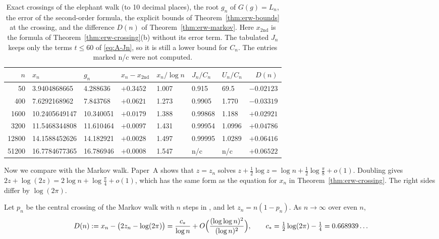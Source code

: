 \begin{table}[t]
\centering\small
\begin{tabular}{@{}rllllllr@{}}
\toprule
$n$ & $x_n$ & $g_n$ & $x_n-x_{\mathrm{2nd}}$ & $x_n/\log n$ & $J_n/C_n$ & $U_n/C_n$ & $D(n)$\\
\midrule
50 & 3.9404868665 & 4.288636 & $+0.3452$ & 1.007 & 0.915 & 69.5 & $-0.02123$\\
400 & 7.6292168962 & 7.843768 & $+0.0621$ & 1.273 & 0.9905 & 1.770 & $-0.03319$\\
1600 & 10.2405649147 & 10.340051 & $+0.0179$ & 1.388 & 0.99868 & 1.188 & $+0.02921$\\
3200 & 11.5468344808 & 11.610464 & $+0.0097$ & 1.431 & 0.99954 & 1.0996 & $+0.04786$\\
12800 & 14.1588452626 & 14.182921 & $+0.0028$ & 1.497 & 0.99995 & 1.0289 & $+0.06416$\\
51200 & 16.7784677365 & 16.786946 & $+0.0008$ & 1.547 & n/c & n/c & $+0.06522$\\
\bottomrule
\end{tabular}
\caption{Exact crossings of the elephant walk (to 10 decimal places), the
root $g_n$ of $G(g)=L_n$, the error of the second-order formula, the
explicit bounds of Theorem~\ref{thm:erw-bounds} at the crossing, and the
difference $D(n)$ of Theorem~\ref{thm:erw-markov}. Here $x_{\mathrm{2nd}}$
is the formula of Theorem~\ref{thm:erw-crossing}(b) without its error term.
The tabulated $J_n$ keeps only the terms $t\le60$ of \eqref{eq:A-Jn}, so it
is still a lower bound for $C_n$. The entries marked n/c were not
computed.}
\label{tab:erw-crossing}
\end{table}

Now we compare with the Markov walk. Paper~A \cite{paperA} shows that
$z=z_n$ solves $z+\frac12\log z=\log n+\frac12\log\frac\pi8+o(1)$. Doubling
gives $2z+\log(2z)=2\log n+\log\frac\pi4+o(1)$, which has the same form as
the equation for $x_n$ in Theorem~\ref{thm:erw-crossing}. The right sides
differ by $\log(2\pi)$.

\begin{theorem}\label{thm:erw-markov}
Let $p_n$ be the central crossing of the Markov walk with $n$ steps in
\cite{paperA}, and let $z_n=n(1-p_n)$. As $n\to\infty$ over even $n$,
\[
 D(n):=x_n-\bigl(2z_n-\log(2\pi)\bigr)=\frac{c_*}{\log n}
 +O\Bigl(\frac{(\log\log n)^2}{(\log n)^2}\Bigr),\qquad
 c_*=\tfrac12\log(2\pi)-\tfrac14=0.668939\ldots
\]
\end{theorem}

